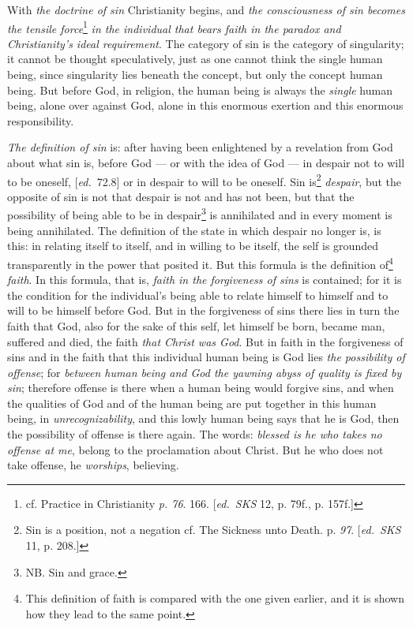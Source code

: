 \documentclass[12pt,a4paper,openany]{book}
\newcommand{\kpage}[1]{\marginnote{\footnotesize\textit{[#1]}}}
\newcommand{\ed}[1]{{\small[\textit{ed.}\ #1]}}
\begin{document}
With \emph{the doctrine of sin} Christianity begins, and \emph{the consciousness of sin
becomes the tensile force}\footnote[82]{cf. Practice in Christianity \emph{p. 76}. 166. \ed{\emph{SKS} 12, p. 79f., p. 157f.}}
\emph{in the individual that bears faith in the paradox and Christianity's
ideal requirement}. The category of sin is the category of singularity;
it cannot be thought speculatively, just as one cannot
think the single human being, since singularity lies beneath the concept,
but only the concept human being. But before God, in religion, the
human being is always the \emph{single} human being, alone over against God, alone in
this enormous exertion and this enormous responsibility.

\emph{The definition of sin} is: after having been enlightened by a revelation from God
about what sin is, before God --- or with the idea of God
--- in despair not to will to be oneself, \ed{72.8} or in despair to will to
be oneself. Sin is\footnote[83]{Sin is a position, not a negation cf. The Sickness unto Death. p. \emph{97}. \ed{\emph{SKS} 11, p. 208.}}
\emph{despair}, but the opposite of sin is
not that despair is not and has not been, but that the possibility
of being able to be in despair\footnote[84]{NB. Sin and grace.}
is annihilated and in every moment is being annihilated.
\kpage{152}The definition of the state in which despair no longer
is, is this: in relating itself to itself, and in willing to be itself,
the self is grounded transparently in the power that posited it. But this
formula is the definition of\footnote[85]{This definition of faith is compared with the one given earlier, and it is shown
how they lead to the same point.}
\emph{faith}. In this formula, that is, \emph{faith
in the forgiveness of sins} is contained; for it is the condition for the individual's
being able to relate himself to himself and to will to be himself before God. But in
the forgiveness of sins there lies in turn the faith that God, also for the sake of this
self, let himself be born, became man, suffered and died, the faith
\emph{that Christ was God}. But in faith in the forgiveness of sins and in the faith
that this individual human being is God lies \emph{the possibility of offense}; for \emph{between
human being and God the yawning abyss of quality is fixed by sin}; therefore
offense is there when a human being would forgive sins, and when
the qualities of God and of the human being are put together in this human being,
in \emph{unrecognizability}, and this lowly human being says that he is God,
then the possibility of offense is there again. The words: \emph{blessed is he who takes no offense
at me}, belong to the proclamation about Christ. But he who
does not take offense, he \emph{worships}, believing.
\end{document}
